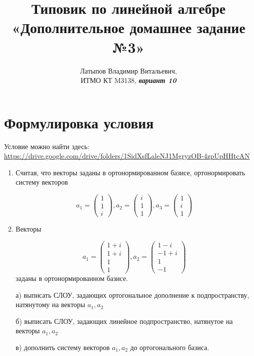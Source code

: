 \documentclass[12pt, a4paper]{article}
\author{Латыпов Владимир Витальевич, \\ ИТМО КТ M3138, \Huge{\textit{\textbf{вариант 10}}}}
\title{Типовик по линейной алгебре «Дополнительное домашнее задание №3»}
\begin{document}
    \tit

    \section{Формулировка условия}

    \begin{statement}
        Условие можно найти здесь: \url{https://drive.google.com/drive/folders/1SidXsfLaleNJ1MgryzOB-4zpUpHHtcAN}

        \begin{enumerate}
            \item Считая, что векторы заданы в ортонормированном базисе, ортонормировать систему векторов

            \begin{equation}
                a_1 = \begin{pmatrix}
                    1\\1\\i
                \end{pmatrix},
                a_2 = \begin{pmatrix}
                    i\\1\\1
                \end{pmatrix},
                a_3 = \begin{pmatrix}
                    1\\i\\1
                \end{pmatrix}
            \end{equation}            
            
            \item Векторы
            
            \begin{equation}
                a_1 = \begin{pmatrix}
                    1+i \\ 1+i \\ 1 \\ 1
                \end{pmatrix},
                a_2 = \begin{pmatrix}
                    1-i\\-1+i\\1\\-1
                \end{pmatrix}    
            \end{equation}
            заданы в ортонормированном базисе.
            
            а) выписать СЛОУ, задающих ортогональное дополнение к подпространству, натянутому на векторы $a_1, a_2$
            
            б) выписать СЛОУ, задающих линейное подпространство, натянутое на векторы $a_1, a_2$
            
            в) дополнить систему векторов $a_1, a_2$ до ортогонального базиса.
        \end{enumerate}
        
    \end{statement}
\end{document}
